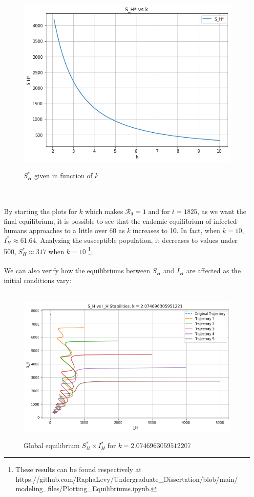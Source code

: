 \begin{figure}[!ht]
        \centering
        \hbox{\hspace{5.0em} \includegraphics[scale=0.6] {THESIS-Equilibrium_SH_vs_k.png}}
        \caption{$S_H^*$ given in function of $k$}
\end{figure}
\\\\
By starting the plots for $k$ which makes $\mathcal{R}_0 = 1$ and for $t=1825$, 
as we want the final equilibrium, 
it is possible to see that the endemic equilibrium of infected 
humans approaches to a little over 60 as $k$ increases to 10. 
In fact, when $k=10$, $I_H^* \approx 61.64$. Analyzing the 
susceptible population, it decreases to values under 500, 
$S_H^* \approx 317$ when $k=10$ \footnote{These results can be found respectively at
https://github.com/RaphaLevy/Undergraduate\_Dissertation/blob/main/
\\modeling\_files/Plotting\_Equilibriums.ipynb.}.
\\\\ 
We can also verify how the equilibriums between $S_H$ and $I_H$ are affected 
as the initial conditions vary:
\begin{figure}[!ht]
        \centering
        \hbox{\hspace{3.2em} \includegraphics[scale=0.55] {THESIS-SH_vs_IH_k=2_075.png}}
        \caption{Global equilibrium $S_H^* \times I_H^*$ for $k=2.0746963059512207$}
\end{figure}

